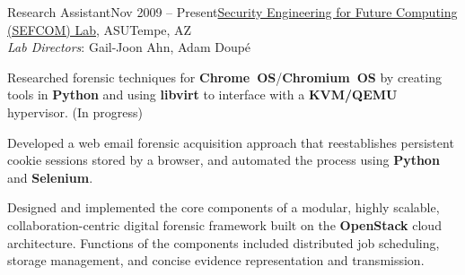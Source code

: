 
\def\PositionTitle{Research Assistant}
\def\PositionPeriod{Nov 2009 -- Present}
\def\OrgName{\href{http://sefcom.asu.edu/}{Security Engineering for Future Computing (SEFCOM) Lab}, ASU}
\def\OrgLocation{Tempe, AZ}


\begin{rExperience}{\PositionTitle}{\PositionPeriod}{\OrgName}{\OrgLocation\\
  {\textnormal{\textit{Lab Directors}: Gail-Joon Ahn, Adam Doup\'{e}%
  }}}



        \item Researched forensic techniques for \textbf{Chrome~OS}/\textbf{Chromium~OS} by creating tools in \textbf{Python} and using \textbf{libvirt} to interface with a \textbf{KVM/QEMU} hypervisor. (In progress)

        \item Developed a web email forensic acquisition approach that reestablishes persistent cookie sessions stored by a browser, and automated the process using \textbf{Python} and \textbf{Selenium}.

        \item Designed and implemented the core components of a modular, highly scalable, collaboration-centric digital forensic framework built on the \textbf{OpenStack} cloud architecture. Functions of the components included distributed job scheduling, storage management, and concise evidence representation and transmission.



\end{rExperience}
